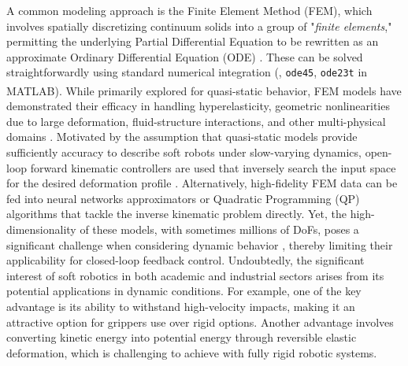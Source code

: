 A common modeling approach is the Finite Element Method (FEM), which involves spatially discretizing continuum solids into a group of "\textit{finite elements}," permitting the underlying Partial Differential Equation to be rewritten as an approximate Ordinary Differential Equation (ODE) \cite{Holzapfel2002,Kim2018}. These can be solved straightforwardly using standard numerical integration (\eg, \texttt{ode45}, \texttt{ode23t} in MATLAB\textsuperscript{\scriptsize\textregistered}).
%
While primarily explored for quasi-static behavior, FEM models have demonstrated their efficacy in handling hyperelasticity, geometric nonlinearities due to large deformation, fluid-structure interactions, and other multi-physical domains \cite{Xavier2022Jun,Hughes2016Nov,Smith2022_FEM,Moerman2018,Maas2012}. Motivated by the assumption that quasi-static models provide sufficiently accuracy to describe soft robots under slow-varying dynamics, open-loop forward kinematic controllers are used that inversely search the input space for the desired deformation profile \cite{Marchese2015,Bern2019,Marchese2016}. Alternatively, high-fidelity FEM data can be fed into neural networks approximators \cite{Fang2022Jun,Zheng2020May} or Quadratic Programming (QP) algorithms \cite{Bern2019} that tackle the inverse kinematic problem directly. Yet, the high-dimensionality of these models, with sometimes millions of DoFs, poses a significant challenge when considering dynamic behavior \cite{Goury2018,Duriez2013}, thereby limiting their applicability for closed-loop feedback control. Undoubtedly, the significant interest of soft robotics in both academic and industrial sectors arises from its potential applications in dynamic conditions. For example, one of the key advantage is its ability to withstand high-velocity impacts, making it an attractive option for grippers use over rigid options. Another advantage involves converting kinetic energy into potential energy through reversible elastic deformation, which is challenging to achieve with fully rigid robotic systems.

